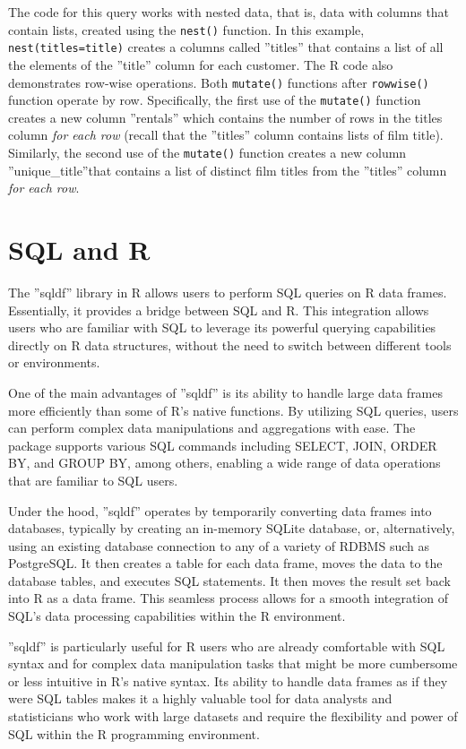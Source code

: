The code for this query works with nested data, that is, data with columns that contain lists, created using the \texttt{nest()} function. In this example, \texttt{nest(titles=title)} creates a columns called ''titles'' that contains a list of all the elements of the ''title'' column for each customer. The R code also demonstrates row-wise operations. Both \texttt{mutate()} functions after \texttt{rowwise()} function operate by row. Specifically, the first use of the \texttt{mutate()} function creates a new column ''rentals'' which contains the number of rows in the titles column \emph{for each row} (recall that the ''titles'' column contains lists of film title). Similarly, the second use of the \texttt{mutate()} function creates a new column ''unique\_title''that contains a list of distinct film titles from the ''titles'' column \emph{for each row}.

\section{SQL and R}

The ''sqldf'' library in R allows users to perform SQL queries on R data frames. Essentially, it provides a bridge between SQL and R. This integration allows users who are familiar with SQL to leverage its powerful querying capabilities directly on R data structures, without the need to switch between different tools or environments.

One of the main advantages of ''sqldf'' is its ability to handle large data frames more efficiently than some of R's native functions. By utilizing SQL queries, users can perform complex data manipulations and aggregations with ease. The package supports various SQL commands including SELECT, JOIN, ORDER BY, and GROUP BY, among others, enabling a wide range of data operations that are familiar to SQL users.

Under the hood, ''sqldf'' operates by temporarily converting data frames into databases, typically by creating an in-memory SQLite database, or, alternatively, using an existing database connection to any of a variety of RDBMS such as PostgreSQL. It then creates a table for each data frame, moves the data to the database tables, and executes SQL statements. It then moves the result set back into R as a data frame. This seamless process allows for a smooth integration of SQL's data processing capabilities within the R environment.

''sqldf'' is particularly useful for R users who are already comfortable with SQL syntax and for complex data manipulation tasks that might be more cumbersome or less intuitive in R's native syntax. Its ability to handle data frames as if they were SQL tables makes it a highly valuable tool for data analysts and statisticians who work with large datasets and require the flexibility and power of SQL within the R programming environment.

